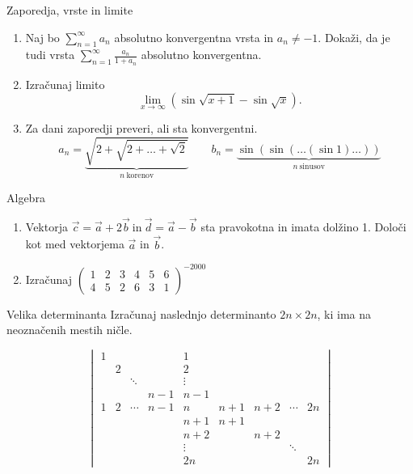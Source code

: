 \begin{frame}{Zaporedja, vrste in limite}
	\begin{enumerate}
		\item 
		Naj bo $\sum _{n=1}^{\infty} a_n$ absolutno konvergentna vrsta in $a_n \ne -1$.
		Dokaži, da je tudi vrsta $\sum_{n=1}^\infty \frac{a_n}{1+a_n}$
		absolutno konvergentna.

		\item
		Izračunaj limito
		$$\lim_{x \rightarrow \infty}(\sin\sqrt{x + 1} - \sin\sqrt{x}).$$

		\item
		Za dani zaporedji preveri, ali sta konvergentni.
		$$ a_n =\underbrace{ \sqrt{2+\sqrt{2+\dots+\sqrt{2}}}}_{n~\text{korenov}} \qquad
		 b_n =\underbrace{ \sin(\sin(\dots(\sin 1)\dots))}_{n~\text{sinusov}}
		$$
	\end{enumerate}
\end{frame}

\begin{frame}{Algebra}
	\begin{enumerate}
		\item
		Vektorja $\vec{c} = \vec{a} + 2\vec{b}~\text{in}~ \vec{d}=\vec{a}-\vec{b} $
		sta pravokotna in imata dolžino 1. Določi kot med vektorjema $\vec{a}$ in $\vec{b}$.
		\item 
		Izračunaj
	$	\begin{pmatrix}
		1 & 2 &3&4&5&6\\
		4&5&2&6&3&1
		\end{pmatrix}^{-2000}
$
	\end{enumerate}
\end{frame}

\begin{frame}{Velika determinanta}
	Izračunaj naslednjo determinanto $2n \times 2n$, ki ima na neoznačenih mestih ničle.

\[
\begin{vmatrix}
1	&  		&   	&		& 1 	&  		&  		& 		& 		 \\
 	& 2 	&  		&		& 2 	&  		& 		& 		& 		 \\
 	&  		& \ddots&		& \vdots&  		&  		& 		& 		 \\
 	& 		&    	&n-1	& n-1 	&  		& 		& 		& 		 \\
1	& 2 	& \cdots&n-1	& n 	& n+1 	& n+2	&\cdots &2n 	 \\
 	&		& 		&		& n+1 	& n+1 	& 	 	& 	 	& 	 	 \\
	& 		& 		&		& n+2	& 		& n+2	& 		& 		 \\
 	& 	 	& 		&		& \vdots&   	& 		& \ddots&  		\\
	&		&		&		&2n		&		&		&		&2n
\end{vmatrix}
\]


\end{frame}

